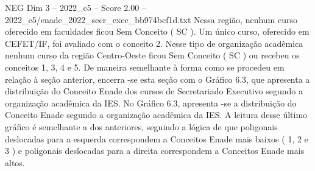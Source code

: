 \begin{textsample}{NEG Dim 3 – 2022\_c5 – Score 2.00 – 2022\_c5/enade\_2022\_secr\_exec\_bb974bcf1d.txt}
Nessa região, nenhum curso oferecido em faculdades ficou Sem Conceito ( SC ).
Um único curso, oferecido em CEFET/IF, foi avaliado com o conceito 2.
Nesse tipo de organização acadêmica nenhum curso da região Centro-Oeste ficou Sem Conceito ( SC ) ou recebeu os conceitos 1, 3, 4 e 5.
De maneira semelhante à forma como se procedeu em relação à seção anterior, encerra -se esta seção com o Gráfico 6.3, que apresenta a distribuição do Conceito Enade dos cursos de Secretariado Executivo segundo a organização acadêmica da IES.
No Gráfico 6.3, apresenta -se a distribuição do Conceito Enade segundo a organização acadêmica da IES.
A leitura desse último gráfico é semelhante a dos anteriores, seguindo a lógica de que poligonais deslocadas para a esquerda correspondem a Conceitos Enade mais baixos ( 1, 2 e 3 ) e poligonais deslocadas para a direita correspondem a Conceitos Enade mais altos.

\end{textsample}
